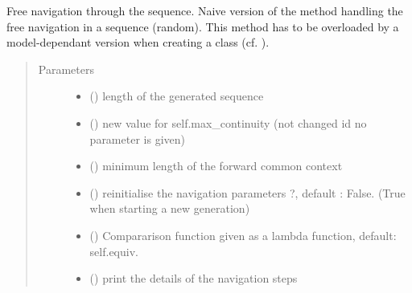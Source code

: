 \documentclass[letterpaper,10pt,english]{sphinxmanual}
\begin{document}
\begin{fulllineitems}
\begin{fulllineitems}
\label{\detokenize{index:Navigator.Navigator.free_generation}}
Free navigation through the sequence. 
Naive version of the method handling the free navigation in a sequence (random). 
This method has to be overloaded by a model-dependant version when creating a  class (cf. ).
\begin{quote}\begin{description}
\item[{Parameters}] \leavevmode\begin{itemize}
\item {} 
 () \textendash{} length of the generated sequence

\item {} 
 () \textendash{} new value for self.max\_continuity (not changed id no parameter is given)

\item {} 
 () \textendash{} minimum length of the forward common context

\item {} 
 () \textendash{} reinitialise the navigation parameters ?, default : False. (True when starting a new generation)

\item {} 
 () \textendash{} Compararison function given as a lambda function, default: self.equiv.

\item {} 
 () \textendash{} print the details of the navigation steps


\end{itemize}
\end{description}
\end{quote}
\end{fulllineitems}
\end{fulllineitems}
\end{document}
